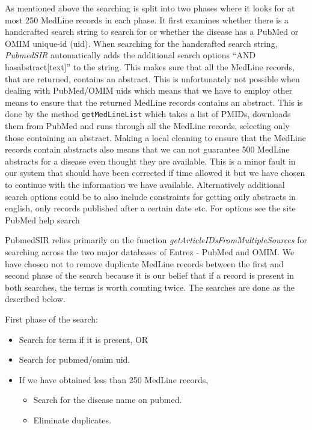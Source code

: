 As mentioned above the searching is split into two phases where it
looks for at most 250 MedLine records in each phase. It first examines
whether there is a handcrafted search string to search for or whether
the disease has a PubMed or OMIM unique-id (uid). When searching for
the handcrafted search string, \textit{PubmedSIR} automatically adds the
additional search options ``AND hasabstract[text]'' to the string. This
makes sure that all the MedLine records, that are returned, contains
an abstract. This is unfortunately not possible when dealing with
PubMed/OMIM uids which means that we have to employ other means to
ensure that the returned MedLine records contains an abstract. This is
done by the method \texttt{getMedLineList} which takes a list of
PMIDs, downloads them from PubMed and runs through all the MedLine
records, selecting only those containing an abstract. Making a local
cleaning to ensure that the MedLine records contain abstracts also
means that we can not guarantee 500 MedLine abstracts for a disease
even thought they are available. This is a minor fault in our system
that should have been corrected if time allowed it but we have chosen
to continue with the information we have available. Alternatively
additional search options could be to also include constraints for
getting only abstracts in english, only records published after a
certain date etc. For options see the site PubMed help search
\cite{PubmedHelpSearch}

PubmedSIR relies primarily on the function
\textit{getArticleIDsFromMultipleSources} for searching across the two
major databases of Entrez - PubMed and OMIM. We have chosen not to
remove duplicate MedLine records between the first and second phase of
the search because it is our belief that if a record is present in
both searches, the terms is worth counting twice. The searches are
done as the described below.

First phase of the search:
\begin{itemize}

\item Search for term if it is present, OR

\item Search for pubmed/omim uid.

\item If we have obtained less than 250 MedLine records,
  
\begin{itemize}

  \item Search for the disease name on pubmed.

  \item Eliminate duplicates.

  \end{itemize}
\end{itemize}

